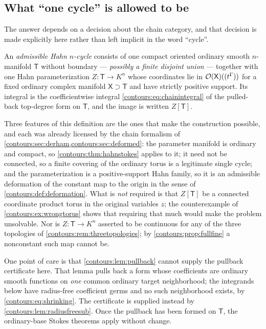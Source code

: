 \documentclass[11pt,letterpaper]{article}
\theoremstyle{definition}
\theoremstyle{remark}
\numberwithin{equation}{section}
\begin{document}
\subsection{What ``one cycle'' is allowed to be}
\label{contours:subsec:onecycle}
The answer depends on a decision about the chain category, and that decision is
made explicitly here rather than left implicit in the word ``cycle''.

\begin{definition}
\label{contours:def:hahncycle}
An \emph{admissible Hahn $n$-cycle} consists of one compact oriented ordinary
smooth $n$-manifold $\mathsf T$ without boundary --- \emph{possibly a finite
disjoint union} --- together with one Hahn parameterization
$Z:\mathsf T\to K^n$ whose coordinates lie in
$\mathcal O(\mathsf X)((t^\Gamma))$ for a fixed ordinary complex manifold
$\mathsf X\supset\mathsf T$ and have strictly positive support. Its integral is
the coefficientwise integral \eqref{contours:eq:chainintegral} of the pulled-back
top-degree form on $\mathsf T$, and the image is written $Z[\mathsf T]$.
\end{definition}

Three features of this definition are the ones that make the construction
possible, and each was already licensed by the chain formalism of
\cref{contours:sec:derham,contours:sec:deformed}: the parameter manifold is
ordinary and compact, so \cref{contours:thm:hahnstokes} applies to it; it need
not be connected, so a finite covering of the ordinary torus is a legitimate
single cycle; and the parameterization is a positive-support Hahn family, so it
is an admissible deformation of the constant map to the origin in the sense of
\cref{contours:def:deformation}. What is \emph{not} required is that
$Z[\mathsf T]$ be a connected coordinate product torus in the original
variables $z$; the counterexample of \cref{contours:ex:wrongtorus} shows that
requiring that much would make the problem unsolvable. Nor is
$Z:\mathsf T\to K^n$ asserted to be continuous for any of the three topologies
of \cref{contours:rem:threetopologies}; by \cref{contours:prop:fullfine} a
nonconstant such map cannot be.

One point of care is that \cref{contours:lem:pullback} cannot supply the
pullback certificate here. That lemma pulls back a form whose coefficients are
ordinary smooth functions on \emph{one} common ordinary target neighborhood; the
integrands below have radius-free coefficient germs and no such neighborhood
exists, by \eqref{contours:eq:shrinking}. The certificate is supplied instead by
\cref{contours:lem:radiusfreesub}. Once the pullback has been formed on
$\mathsf T$, the ordinary-base Stokes theorems apply without change.
\end{document}
